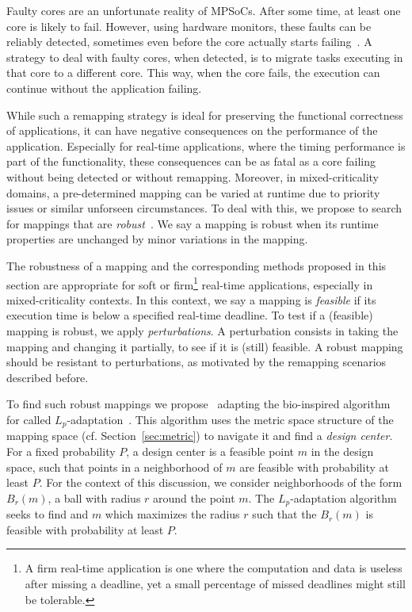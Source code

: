 Faulty cores are an unfortunate reality of \acp{MPSoC}. After some time, at least one core is likely to fail.
However, using hardware monitors, these faults can be reliably detected, sometimes even before the core actually starts failing~\cite{zhang2011dependability,zhao2019health}.
A strategy to deal with faulty cores, when detected, is to migrate tasks executing in that core to a different core.
This way, when the core fails, the execution can continue without the application failing. 

While such a remapping strategy is ideal for preserving the functional correctness of applications, it can have negative consequences on the performance of the application.
Especially for real-time applications, where the timing performance is part of the functionality, these consequences can be as fatal as a core failing without being detected or without remapping.
Moreover, in mixed-criticality domains, a pre-determined mapping can be varied at runtime due to priority issues or similar unforseen circumstances.
To deal with this, we propose to search for mappings that are \emph{robust}~\cite{hempel_scopes17}.
We say a mapping is robust when its runtime properties are unchanged by minor variations in the mapping.

The robustness of a mapping and the corresponding methods proposed in this section are appropriate for soft or firm\footnote{A firm real-time application is one where the computation and data is useless after missing a deadline, yet a small percentage of missed deadlines might still be tolerable.} real-time applications, especially in mixed-criticality contexts.
In this context, we say a mapping is \emph{feasible} if its execution time is below a specified real-time deadline.
To test if a (feasible) mapping is robust, we apply \emph{perturbations}.
A perturbation consists in taking the mapping and changing it partially, to see if it is (still) feasible.
A robust mapping should be resistant to perturbations, as motivated by the remapping scenarios described before.

To find such robust mappings we propose~\cite{hempel_scopes17} adapting the bio-inspired algorithm for called $L_p$-adaptation~\cite{asmus2017lp}.
This algorithm uses the metric space structure of the mapping space (cf. Section~\ref{sec:metric}) to navigate it and find a \emph{design center}.
For a fixed probability $P$, a design center is a feasible point $m$ in the design space, such that points in a neighborhood of $m$ are feasible with probability at least $P$.
For the context of this discussion, we consider neighborhoods of the form $B_r(m)$, a ball with radius $r$ around the point $m$.
The $L_p$-adaptation algorithm seeks to find and $m$ which maximizes the radius $r$ such that the $B_r(m)$ is feasible with probability at least $P$.

